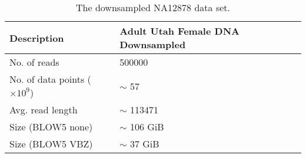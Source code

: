 \begin{table}
    \caption{\label{tab:data}The downsampled NA12878 data set.}
	\begin{tabular}{|l|m{4cm}|}
        \hline
        Description & Adult Utah Female DNA Downsampled\\
        \hline
	No. of reads & \num{500000}\\
	No. of data points ($\times 10^9$) & $\sim$ 57\\
	Avg. read length & $\sim$ \num{113471}\\
    Size (BLOW5 none) & $\sim$ 106 GiB\\
    Size (BLOW5 VBZ) & $\sim$ 37 GiB\\
	\hline
    \end{tabular}
\end{table}
